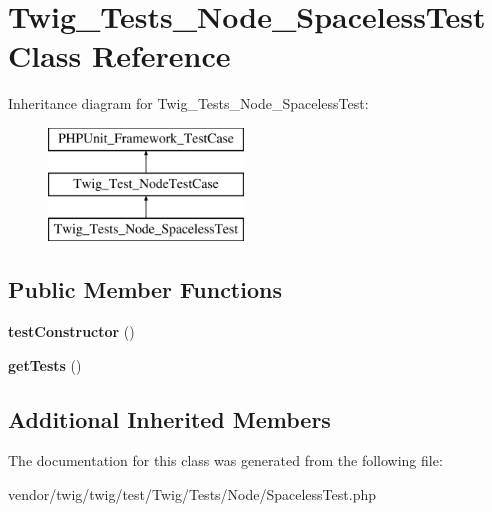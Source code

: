 \hypertarget{classTwig__Tests__Node__SpacelessTest}{}\section{Twig\+\_\+\+Tests\+\_\+\+Node\+\_\+\+Spaceless\+Test Class Reference}
\label{classTwig__Tests__Node__SpacelessTest}
Inheritance diagram for Twig\+\_\+\+Tests\+\_\+\+Node\+\_\+\+Spaceless\+Test\+:\begin{figure}[H]
\begin{center}
\leavevmode
\includegraphics[height=3.000000cm]{classTwig__Tests__Node__SpacelessTest}
\end{center}
\end{figure}
\subsection*{Public Member Functions}
\begin{DoxyCompactItemize}
\item 
{\bfseries test\+Constructor} ()\hypertarget{classTwig__Tests__Node__SpacelessTest_a7c8fdd7614ba27da9641618b7001d143}{}\label{classTwig__Tests__Node__SpacelessTest_a7c8fdd7614ba27da9641618b7001d143}

\item 
{\bfseries get\+Tests} ()\hypertarget{classTwig__Tests__Node__SpacelessTest_a3a22a79cea8840317d24fcc1ba49a355}{}\label{classTwig__Tests__Node__SpacelessTest_a3a22a79cea8840317d24fcc1ba49a355}

\end{DoxyCompactItemize}
\subsection*{Additional Inherited Members}


The documentation for this class was generated from the following file\+:\begin{DoxyCompactItemize}
\item 
vendor/twig/twig/test/\+Twig/\+Tests/\+Node/Spaceless\+Test.\+php\end{DoxyCompactItemize}

